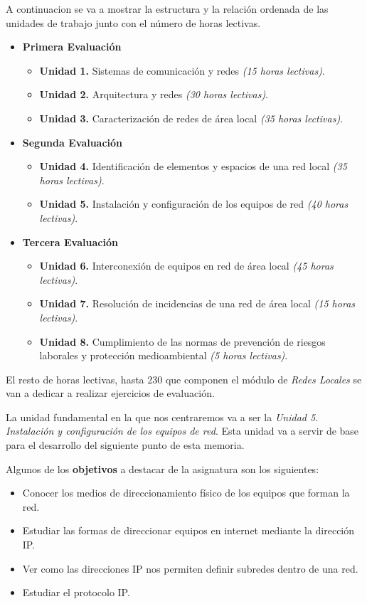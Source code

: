 \documentclass[spanish,12pt, a4paper,twoside]{paper}
\begin{document}
A continuacion se va a mostrar la estructura y la relación ordenada de las unidades de trabajo junto con el número de horas lectivas.
\begin{itemize}
\item \textbf{Primera Evaluación}
\begin{itemize}
\item \textbf{Unidad 1.} Sistemas de comunicación y redes \textit{(15 horas lectivas)}.
\item \textbf{Unidad 2.} Arquitectura y redes \textit{(30 horas lectivas)}.
\item \textbf{Unidad 3.} Caracterización de redes de área local \textit{(35 horas lectivas)}.
\end{itemize}
\item \textbf{Segunda Evaluación}
\begin{itemize}
\item \textbf{Unidad 4.} Identificación de elementos y espacios de una red local \textit{(35 horas lectivas)}.
\item \textbf{Unidad 5.} Instalación y configuración de los equipos de red \textit{(40 horas lectivas)}.
\end{itemize}
\item \textbf{Tercera Evaluación}
\begin{itemize}
\item \textbf{Unidad 6.} Interconexión de equipos en red de área local \textit{(45 horas lectivas)}.
\item \textbf{Unidad 7.} Resolución de incidencias de una red de área local \textit{(15 horas lectivas)}.
\item \textbf{Unidad 8.} Cumplimiento de las normas de prevención de riesgos laborales y protección medioambiental \textit{(5 horas lectivas)}.
\end{itemize}
\end{itemize}

El resto de horas lectivas, hasta 230 que componen el módulo de \textit{Redes Locales} se van a dedicar a realizar ejercicios de evaluación.

La unidad fundamental en la que nos centraremos va a ser la \textit{Unidad 5. Instalación y configuración de los equipos de red}. Esta unidad va a servir de base para el desarrollo del siguiente punto de esta memoria.

Algunos de los \textbf{objetivos} a destacar de la asignatura son los siguientes:
\begin{itemize}
\item Conocer los medios de direccionamiento físico de los equipos que forman la red.
\item Estudiar las formas de direccionar equipos en internet mediante la dirección IP.
\item Ver como las direcciones IP nos permiten definir subredes dentro de una red.
\item Estudiar el protocolo IP.
\end{itemize}
\end{document}
